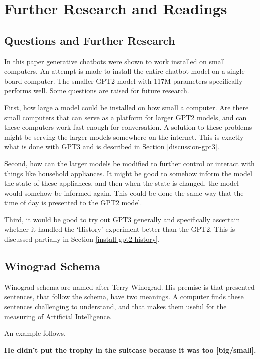 \chapter{Further Research and Readings}

\section{Questions and Further Research}

In this paper generative chatbots were shown to work installed on small computers. An attempt is made to install the entire chatbot model on a single board computer. The smaller GPT2 model with 117M parameters specifically performs well. Some questions are raised for future research.

First, how large a model could be installed on how small a computer. Are there small computers that can serve as a platform for larger GPT2 models, and can these computers work fast enough for conversation. A solution to these problems might be serving the larger models somewhere on the internet. This is exactly what is done with GPT3 and is described in Section \ref{discussion-gpt3}.

Second, how can the larger models be modified to further control or interact with things like household appliances. It might be good to somehow inform the model the state of these appliances, and then when the state is changed, the model would somehow be informed again. This could be done the same way that the time of day is presented to the GPT2 model.

Third, it would be good to try out GPT3 generally and specifically ascertain whether it handled the `History' experiment better than the GPT2. This is discussed partially in Section \ref{install-gpt2-history}. 


\section{Winograd Schema}

Winograd schema are named after Terry Winograd. His premise is that presented sentences, that follow the schema, have two meanings. A computer finds these sentences challenging to understand, and that makes them useful for the measuring of Artificial Intelligence.

An example follows.

\begin{center}
	\textbf{He didn't put the trophy in the suitcase because it was too [big/small].}
\end{center}

